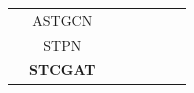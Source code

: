 \documentclass[12pt,a4paper]{report}
\begin{document}
\begin{table}[h!]
{\begin{tabular}{cccccccc}
                                              & ASTGCN          &                              &                            &                            &               &              &               \\
                                              & STPN            &                              &                            &                            &               &              &               \\
                                              & \textbf{STCGAT} &                              &                            &                            &               &              &               \\ \bottomrule
        \end{tabular}
    }
\end{table}
\end{document}
